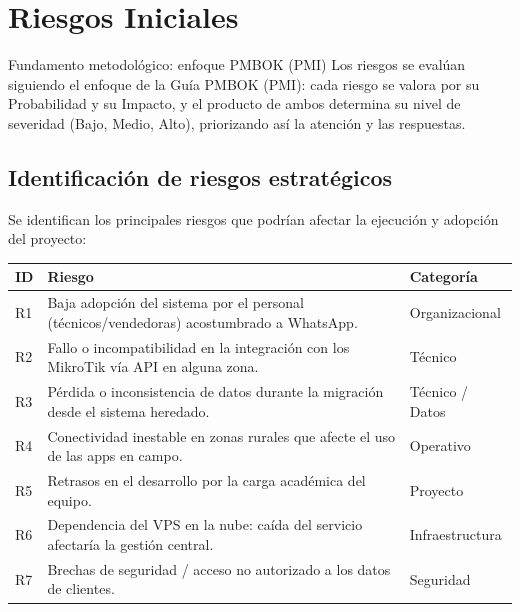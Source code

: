 \section{Riesgos Iniciales}
\label{sec:riesgos}

\begin{upeubox}{Fundamento metodológico: enfoque PMBOK (PMI)}
Los riesgos se evalúan siguiendo el enfoque de la Guía PMBOK (PMI): cada riesgo se
valora por su Probabilidad y su Impacto, y el producto de ambos determina su nivel de
severidad (Bajo, Medio, Alto), priorizando así la atención y las respuestas.
\end{upeubox}

\subsection{Identificación de riesgos estratégicos}

Se identifican los principales riesgos que podrían afectar la ejecución y adopción
del proyecto:

\begin{center}
\label{tab:riesgos-id}
\begin{tabularx}{\textwidth}{C{1cm} X L{2.8cm}}
\toprule
\textbf{ID} & \textbf{Riesgo} & \textbf{Categoría} \\
\midrule
R1 & Baja adopción del sistema por el personal (técnicos/vendedoras) acostumbrado a
WhatsApp. & Organizacional \\
R2 & Fallo o incompatibilidad en la integración con los MikroTik vía API en alguna
zona. & Técnico \\
R3 & Pérdida o inconsistencia de datos durante la migración desde el sistema
heredado. & Técnico / Datos \\
R4 & Conectividad inestable en zonas rurales que afecte el uso de las apps en campo. &
Operativo \\
R5 & Retrasos en el desarrollo por la carga académica del equipo. & Proyecto \\
R6 & Dependencia del VPS en la nube: caída del servicio afectaría la gestión central. &
Infraestructura \\
R7 & Brechas de seguridad / acceso no autorizado a los datos de clientes. & Seguridad \\
\bottomrule
\end{tabularx}
\end{center}

